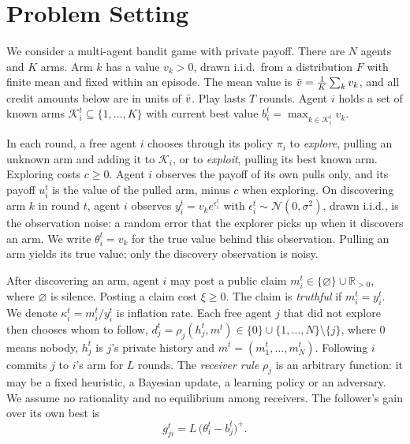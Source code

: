 \section{Problem Setting}
\label{sec:problem}
We consider a multi-agent bandit game with private payoff. 
There are $N$ agents and $K$ arms. Arm $k$ has a value $v_k>0$, drawn i.i.d.\ from a distribution $F$ with finite mean and fixed within an episode. The mean value is $\bar v=\frac1K\sum_k v_k$, and all credit amounts below are in units of $\bar v$. Play lasts $T$ rounds. Agent $i$ holds a set of known arms $\mathcal K_i^t\subseteq\{1,\dots,K\}$ with current best value $b_i^t=\max_{k\in\mathcal K_i^t}v_k$.

In each round, a free agent $i$ chooses through its policy $\pi_i$ to \emph{explore}, pulling an unknown arm and adding it to $\mathcal K_i$, or to \emph{exploit}, pulling its best known arm. Exploring costs $c\ge0$. Agent $i$ observes the payoff of its own pulls only, and its payoff $u_i^t$ is the value of the pulled arm, minus $c$ when exploring. On discovering arm $k$ in round $t$, agent $i$ observes $y_i^t=v_k e^{\epsilon_i^t}$ with $\epsilon_i^t\sim\mathcal N(0,\sigma^2)$, drawn i.i.d., is the observation noise: a random error that the explorer picks up when it discovers an arm. We write $\theta_i^t=v_k$ for the true value behind this observation. Pulling an arm yields its true value; only the discovery observation is noisy.

After discovering an arm, agent $i$ may post a public claim $m_i^t\in\{\varnothing\}\cup\mathbb R_{>0}$, where $\varnothing$ is silence. Posting a claim cost $\xi\ge0$. The claim is \emph{truthful} if $m_i^t=y_i^t$. We denote $\kappa_i^t=m_i^t/y_i^t$ is inflation rate. Each free agent $j$ that did not explore then chooses whom to follow, $d_j^t=\rho_j(h_j^t,m^t)\in\{0\}\cup\{1,\dots,N\}\setminus\{j\}$, where $0$ means nobody, $h_j^t$ is $j$'s private history and $m^t=(m_1^t,\dots,m_N^t)$. Following $i$ commits $j$ to $i$'s arm for $L$ rounds. The \emph{receiver rule} $\rho_j$ is an arbitrary function: it may be a fixed heuristic, a Bayesian update, a learning policy or an adversary. We assume no rationality and no equilibrium among receivers. The follower's gain over its own best is
\begin{equation}
  g_{ji}^t=L\,\big(\theta_i^t-b_j^t\big)^{+}.
  \label{eq:gain}
\end{equation}

